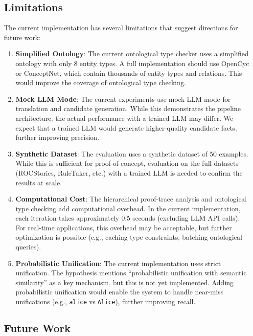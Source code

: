 \documentclass[11pt,letterpaper]{article}
\begin{document}
\subsection{Limitations}

The current implementation has several limitations that suggest directions for future work:

\begin{enumerate}
    \item \textbf{Simplified Ontology}: The current ontological type checker uses a simplified ontology with only 8 entity types. A full implementation should use OpenCyc or ConceptNet, which contain thousands of entity types and relations. This would improve the coverage of ontological type checking.
    
    \item \textbf{Mock LLM Mode}: The current experiments use mock LLM mode for translation and candidate generation. While this demonstrates the pipeline architecture, the actual performance with a trained LLM may differ. We expect that a trained LLM would generate higher-quality candidate facts, further improving precision.
    
    \item \textbf{Synthetic Dataset}: The evaluation uses a synthetic dataset of 50 examples. While this is sufficient for proof-of-concept, evaluation on the full datasets (ROCStories, RuleTaker, etc.) with a trained LLM is needed to confirm the results at scale.
    
    \item \textbf{Computational Cost}: The hierarchical proof-trace analysis and ontological type checking add computational overhead. In the current implementation, each iteration takes approximately 0.5 seconds (excluding LLM API calls). For real-time applications, this overhead may be acceptable, but further optimization is possible (e.g., caching type constraints, batching ontological queries).
    
    \item \textbf{Probabilistic Unification}: The current implementation uses strict unification. The hypothesis mentions ``probabilistic unification with semantic similarity'' as a key mechanism, but this is not yet implemented. Adding probabilistic unification would enable the system to handle near-miss unifications (e.g., \texttt{alice} vs \texttt{Alice}), further improving recall.
\end{enumerate}

\subsection{Future Work}
\end{document}
